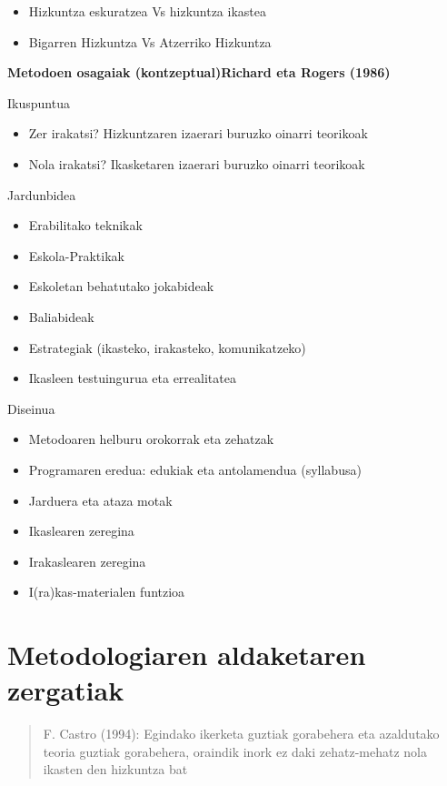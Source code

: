 \documentclass[
]{book}
\providecommand{\tightlist}{%
  \setlength{\itemsep}{0pt}\setlength{\parskip}{0pt}}
\begin{document}
\begin{itemize}
\tightlist
\item
  Hizkuntza eskuratzea Vs hizkuntza ikastea
\item
  Bigarren Hizkuntza Vs Atzerriko Hizkuntza
\end{itemize}

\textbf{Metodoen osagaiak (kontzeptual)Richard eta Rogers (1986)}

Ikuspuntua

\begin{itemize}
\tightlist
\item
  Zer irakatsi? Hizkuntzaren izaerari buruzko oinarri teorikoak
\item
  Nola irakatsi? Ikasketaren izaerari buruzko oinarri teorikoak
\end{itemize}

Jardunbidea

\begin{itemize}
\tightlist
\item
  Erabilitako teknikak
\item
  Eskola-Praktikak
\item
  Eskoletan behatutako jokabideak
\item
  Baliabideak
\item
  Estrategiak (ikasteko, irakasteko, komunikatzeko)
\item
  Ikasleen testuingurua eta errealitatea
\end{itemize}

Diseinua

\begin{itemize}
\tightlist
\item
  Metodoaren helburu orokorrak eta zehatzak
\item
  Programaren eredua: edukiak eta antolamendua (syllabusa)
\item
  Jarduera eta ataza motak
\item
  Ikaslearen zeregina
\item
  Irakaslearen zeregina
\item
  I(ra)kas-materialen funtzioa
\end{itemize}

\hypertarget{metodologiaren-aldaketaren-zergatiak}{%
\section{Metodologiaren aldaketaren zergatiak}\label{metodologiaren-aldaketaren-zergatiak}}

\begin{quote}
F. Castro (1994): Egindako ikerketa guztiak gorabehera eta azaldutako teoria guztiak gorabehera, oraindik inork ez daki zehatz-mehatz nola ikasten den hizkuntza bat
\end{quote}
\end{document}
